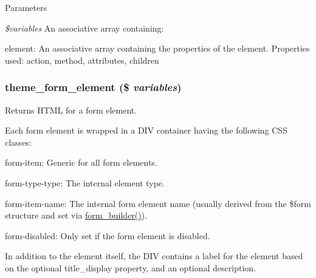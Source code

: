 \begin{DoxyParams}{Parameters}
\item[{\em \$variables}]An associative array containing:
\begin{DoxyItemize}
\item element: An associative array containing the properties of the element. Properties used: action, method, attributes, children 
\end{DoxyItemize}\end{DoxyParams}
\hypertarget{group__themeable_gafa399c53da3c042edf3863f222d036aa}{
\subsubsection[{theme\_\-form\_\-element}]{\setlength{\rightskip}{0pt plus 5cm}theme\_\-form\_\-element (\$ {\em variables})}}
\label{group__themeable_gafa399c53da3c042edf3863f222d036aa}
Returns HTML for a form element.

Each form element is wrapped in a DIV container having the following CSS classes:
\begin{DoxyItemize}
\item form-\/item: Generic for all form elements.
\item form-\/type-\/type: The internal element type.
\item form-\/item-\/name: The internal form element name (usually derived from the \$form structure and set via \hyperlink{group__form__api_gae839323ba1c81ba86030b496fee24f7d}{form\_\-builder()}).
\item form-\/disabled: Only set if the form element is disabled.
\end{DoxyItemize}

In addition to the element itself, the DIV contains a label for the element based on the optional title\_\-display property, and an optional description.


